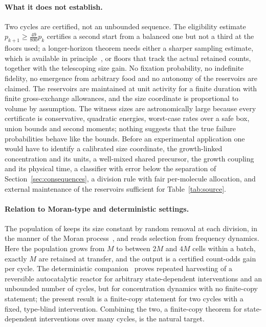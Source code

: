 \documentclass[11pt,a4paper]{article}
\theoremstyle{plain}
\theoremstyle{definition}
\theoremstyle{remark}
\begin{document}
\paragraph{What it does not establish.}
Two cycles are certified, not an unbounded sequence. The eligibility estimate $p_{k+1}\ge\frac{49}{800}p_k$ certifies a second start from a balanced one but not a third at the floors used; a longer-horizon theorem needs either a sharper sampling estimate, which is available in principle~\citep{hoeffding1963,bardenet2015}, or floors that track the actual retained counts, together with the telescoping size gain. No fixation probability, no indefinite fidelity, no emergence from arbitrary food and no autonomy of the reservoirs are claimed. The reservoirs are maintained at unit activity for a finite duration with finite gross-exchange allowances, and the size coordinate is proportional to volume by assumption. The witness sizes are astronomically large because every certificate is conservative, quadratic energies, worst-case rates over a safe box, union bounds and second moments; nothing suggests that the true failure probabilities behave like the bounds. Before an experimental application one would have to identify a calibrated size coordinate, the growth-linked concentration and its units, a well-mixed shared precursor, the growth coupling and its physical time, a classifier with error below the separation of Section~\ref{sec:consequences}, a division rule with fair per-molecule allocation, and external maintenance of the reservoirs sufficient for Table~\ref{tab:source}.

\paragraph{Relation to Moran-type and deterministic settings.}
The population of \citet{matsubara2026} keeps its size constant by random removal at each division, in the manner of the Moran process~\citep{moran1958}, and reads selection from frequency dynamics. Here the population grows from $M$ to between $2M$ and $4M$ cells within a batch, exactly $M$ are retained at transfer, and the output is a certified count-odds gain per cycle. The deterministic companion~\citep{recovery2026} proves repeated harvesting of a reversible autocatalytic reactor for arbitrary state-dependent interventions and an unbounded number of cycles, but for concentration dynamics with no finite-copy statement; the present result is a finite-copy statement for two cycles with a fixed, type-blind intervention. Combining the two, a finite-copy theorem for state-dependent interventions over many cycles, is the natural target.
\end{document}

